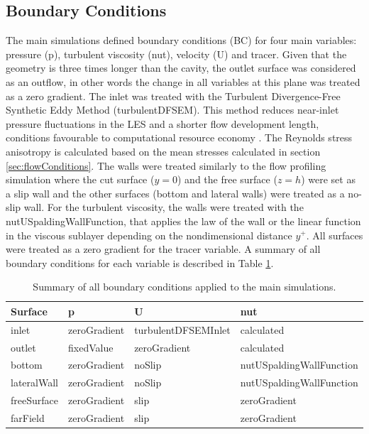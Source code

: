 \begin{refsection}
\subsection{Boundary Conditions}
\label{sec:BC}
The main simulations defined boundary conditions (BC) for four main variables: pressure (p), turbulent viscosity (nut), velocity (U) and tracer. Given that the geometry is three times longer than the cavity, the outlet surface was considered as an outflow, in other words the change in all variables at this plane was treated as a zero gradient. The inlet was treated with the Turbulent Divergence-Free Synthetic Eddy Method (turbulentDFSEM). This method reduces  near-inlet pressure fluctuations in the LES and a shorter flow development length, conditions favourable to computational resource economy \cite{poletto2013}. The Reynolds stress anisotropy is calculated based on the mean stresses calculated in section \ref{sec:flowConditions}. The walls were treated similarly to the flow profiling simulation where the cut surface ($y=0$) and the free surface ($z=h$) were set as a slip wall and the other surfaces (bottom and lateral walls) were treated as a no-slip wall. For the turbulent viscosity, the walls were treated with the nutUSpaldingWallFunction, that applies the law of the wall or the linear function in the viscous sublayer depending on the nondimensional distance $y^+$. All surfaces were treated as a zero gradient for the tracer variable. A summary of all boundary conditions for each variable is described in Table \ref{tab:boundaryConditions}.
\begin{table}[!h]
\centering
\caption{Summary of all boundary conditions applied to the main simulations.}
\label{tab:boundaryConditions}
\begin{tabular}{llll}
Surface     & p            & U                   & nut                         \\ \hline
inlet       & zeroGradient & turbulentDFSEMInlet & calculated \\
outlet      & fixedValue   & zeroGradient        & calculated                  \\
bottom      & zeroGradient & noSlip              & nutUSpaldingWallFunction    \\
lateralWall & zeroGradient & noSlip              & nutUSpaldingWallFunction    \\
freeSurface & zeroGradient & slip                & zeroGradient                \\
farField    & zeroGradient & slip                & zeroGradient               
\end{tabular}
\end{table}


\end{refsection}
